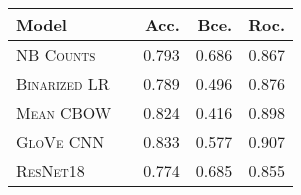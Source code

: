 \documentclass[11pt]{article}
\begin{document}
\begin{table}[h]
\centering
\begin{tabular}{llrrr}
 \toprule
 Model &  & Acc. & Bce. & Roc.\\
 \midrule
 \textsc{NB Counts} & & 0.793  & 0.686 & 0.867\\
 \textsc{Binarized LR} & & 0.789 & 0.496 & 0.876\\
 \textsc{Mean CBOW} & & 0.824 & 0.416 & 0.898\\
 \textsc{GloVe CNN} & & 0.833  & 0.577 & 0.907\\
 \midrule
 \textsc{ResNet18} & & 0.774 & 0.685 & 0.855\\
 \bottomrule
\end{tabular}
\caption{\label{tab:conc} }
\end{table}



\end{document}
